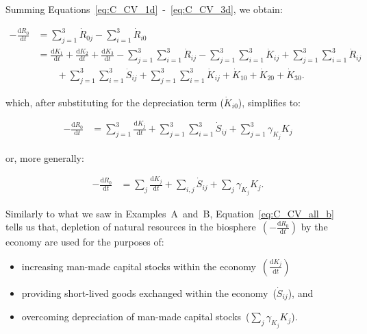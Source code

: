 Summing Equations~\ref{eq:C_CV_1d}~-~\ref{eq:C_CV_3d},
we obtain:

\begin{align}\label{eq:C_CV_all}
	- \frac{\mathrm{d}R_{0}}{\mathrm{d}t}										&
	= \sum_{j = 1}^{3}\dot{R}_{0j}
	- \sum_{i = 1}^{3}\dot{R}_{i0}									\nonumber	\\
	& =\frac{\mathrm{d}K_{1}}{\mathrm{d}t}
	+ \frac{\mathrm{d}K_{2}}{\mathrm{d}t}
	+ \frac{\mathrm{d}K_{3}}{\mathrm{d}t}
	- \sum_{j = 1}^{3}\sum_{i = 1}^{3}\dot{R}_{ij}
	- \sum_{j = 1}^{3}\sum_{i = 1}^{3}\dot{K}_{ij}
	+ \sum_{j = 1}^{3}\sum_{i = 1}^{3}\dot{R}_{ij}		\nonumber	\\
	& \qquad {} + \sum_{j = 1}^{3}\sum_{i = 1}^{3}\dot{S}_{ij}
	+ \sum_{j = 1}^{3}\sum_{i = 1}^{3}\dot{K}_{ij}
	+ \dot{K}_{10}
	+ \dot{K}_{20}
	+ \dot{K}_{30}.
\end{align}

\noindent{}which,
after substituting for 
the depreciation term ($\dot{K}_{i0}$),
simplifies to:

\begin{align}\label{eq:C_CV_all_a}
	- \frac{\mathrm{d}R_{0}}{\mathrm{d}t}										&
	=\sum_{j = 1}^{3}\frac{\mathrm{d}K_{j}}{\mathrm{d}t}
	+ \sum_{j = 1}^{3}\sum_{i = 1}^{3}\dot{S}_{ij}
	+ \sum_{j = 1}^{3}\gamma_{K_{j}}K_{j}
\end{align}

\noindent{}or,
more generally:

\begin{align}\label{eq:C_CV_all_b}
	- \frac{\mathrm{d}R_{0}}{\mathrm{d}t}										&
	=\sum_{j}\frac{\mathrm{d}K_{j}}{\mathrm{d}t}
	+ \sum_{i,j}\dot{S}_{ij}
	+ \sum_{j}\gamma_{K_{j}}K_{j}.
\end{align}

Similarly to what we saw in Examples~A~and~B,
Equation~\ref{eq:C_CV_all_b} tells us that,
depletion of natural resources in the 
biosphere~$\left(- \frac{\mathrm{d}R_{0}}{\mathrm{d}t}\right)$
by the economy
are used for the purposes of:

\begin{itemize}
	\item increasing man-made capital stocks
	within the economy~$\left(\frac{\mathrm{d}K_{j}}{\mathrm{d}t}\right)$
	\item providing short-lived goods exchanged within the
	economy~($\dot{S}_{ij}$), and
	\item overcoming depreciation of man-made
	capital stocks~($\sum_{j}\gamma_{K_{j}}K_{j}$).
\end{itemize}

